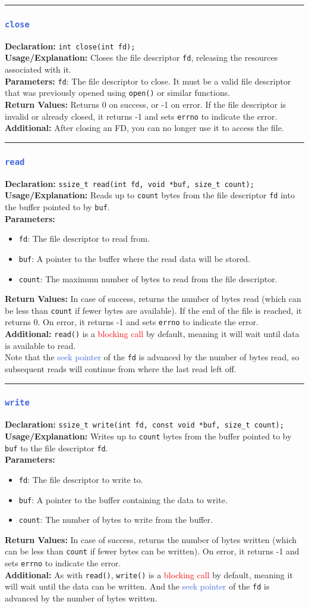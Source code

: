 \documentclass[openany,12pt]{book}
\newcommand{\code}[1]{\texttt{#1}}
\newcommand{\red}[1]{\textcolor{red}{#1}}
\newcommand{\blue}[1]{\textcolor{RoyalBlue}{#1}}
\newcommand{\functionEntry}[6]{%
  \noindent\rule{\linewidth}{0.5pt}
  \subsubsection*{\blue{\large{\texttt{#1}}}}
  \textbf{Declaration:} \texttt{#2} \\
  \textbf{Usage/Explanation:} #3 \\
  \textbf{Parameters:} #4 \\
  \textbf{Return Values:} #5 \\
  \textbf{Additional:} #6
  \vspace{1em}
}
\newcommand{\functionEntryPar}[6]{%
  \noindent\rule{\linewidth}{0.5pt}
  \subsubsection*{\blue{\large{\texttt{#1}}}}
  \textbf{Declaration:} \texttt{#2} \\
  \textbf{Usage/Explanation:} #3 \\
  \textbf{Parameters:}
  \begin{itemize}[leftmargin=*]
    #4
  \end{itemize}
  \textbf{Return Values:} #5 \\
  \textbf{Additional:} #6
  \vspace{1em}
}
\begin{document}
\functionEntry{close}
{int close(int fd);}
{Closes the file descriptor \code{fd}, releasing the resources associated with it.}
{\code{fd}: The file descriptor to close. It must be a valid file descriptor that was previously opened using \code{open()} or similar functions.}
{Returns 0 on success, or -1 on error. If the file descriptor is invalid or already closed, it returns -1 and sets \code{errno} to indicate the error.}
{After closing an FD, you can no longer use it to access the file. \label{func:close}}


\functionEntryPar{read}
{ssize\_t read(int fd, void *buf, size\_t count);}
{Reads up to \code{count} bytes from the file descriptor \code{fd} into the buffer pointed to by \code{buf}.}
{\item \code{fd}: The file descriptor to read from.
  \item \code{buf}: A pointer to the buffer where the read data will be stored.
  \item \code{count}: The maximum number of bytes to read from the file descriptor.}
{In case of success, returns the number of bytes read (which can be less than \code{count} if fewer bytes are available). If the end of the file is reached, it returns 0. On error, it returns -1 and sets \code{errno} to indicate the error.}
{\code{read()} is a \red{blocking call} by default, meaning it will wait until data is available to read.\\
  Note that the \blue{seek pointer} of the \code{fd} is advanced by the number of bytes read, so subsequent reads will continue from where the last read left off.\label{func:read}}

\functionEntryPar{write}
{ssize\_t write(int fd, const void *buf, size\_t count);}
{Writes up to \code{count} bytes from the buffer pointed to by \code{buf} to the file descriptor \code{fd}.}
{\item \code{fd}: The file descriptor to write to.
  \item \code{buf}: A pointer to the buffer containing the data to write.
  \item \code{count}: The number of bytes to write from the buffer.}
{In case of success, returns the number of bytes written (which can be less than \code{count} if fewer bytes can be written). On error, it returns -1 and sets \code{errno} to indicate the error.}
{As with \code{read()}, \code{write()} is a \red{blocking call} by default, meaning it will wait until the data can be written. And the \blue{seek pointer} of the \code{fd} is advanced by the number of bytes written. \label{func:write}}
\end{document}

